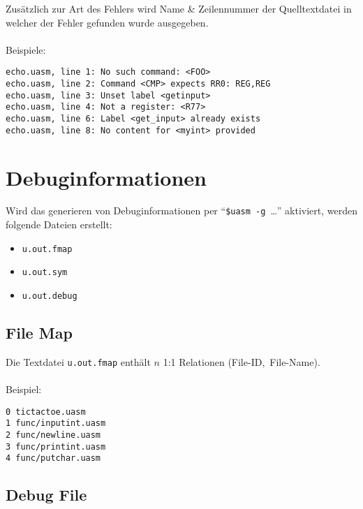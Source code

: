 \begin{frame}[fragile]{\insertsection}
    Zusätzlich zur Art des Fehlers wird Name \& Zeilennummer der Quelltextdatei
    in welcher der Fehler gefunden wurde ausgegeben.\\~\\
    Beispiele:
\begin{verbatim}
echo.uasm, line 1: No such command: <FOO>
echo.uasm, line 2: Command <CMP> expects RR0: REG,REG
echo.uasm, line 3: Unset label <getinput>
echo.uasm, line 4: Not a register: <R77>
echo.uasm, line 6: Label <get_input> already exists
echo.uasm, line 8: No content for <myint> provided
\end{verbatim}
\end{frame}

\section{Debuginformationen}

\begin{frame}{\insertsection}
    Wird das generieren von Debuginformationen per ``\texttt{\$uasm~-g}~\ldots''
    aktiviert, werden folgende Dateien erstellt:
    \begin{itemize}
        \item \texttt{u.out.fmap}
        \item \texttt{u.out.sym}
        \item \texttt{u.out.debug}
    \end{itemize}
\end{frame}

\subsection{File Map}

\begin{frame}[fragile]{\insertsubsection}
    Die Textdatei \texttt{u.out.fmap} enthält $n$ 1:1 Relationen (File-ID,~File-Name).
    \\~\\
    Beispiel:
\begin{verbatim}
0 tictactoe.uasm
1 func/inputint.uasm
2 func/newline.uasm
3 func/printint.uasm
4 func/putchar.uasm
\end{verbatim}
\end{frame}

\subsection{Debug File}

